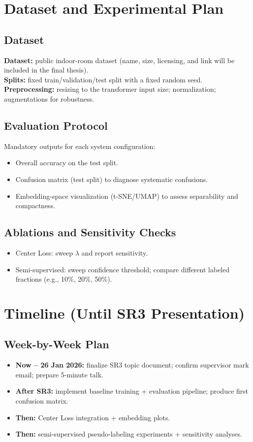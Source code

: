 \documentclass[english]{teza-upb_en}
\begin{document}
\chapter{Dataset and Experimental Plan}

\section{Dataset}
\textbf{Dataset:} public indoor-room dataset (name, size, licensing, and link will be included in the final thesis).\\
\textbf{Splits:} fixed train/validation/test split with a fixed random seed.\\
\textbf{Preprocessing:} resizing to the transformer input size; normalization; augmentations for robustness.

\section{Evaluation Protocol}
Mandatory outputs for each system configuration:
\begin{itemize}
  \item Overall accuracy on the test split.
  \item Confusion matrix (test split) to diagnose systematic confusions.
  \item Embedding-space visualization (t-SNE/UMAP) to assess separability and compactness.
\end{itemize}

\section{Ablations and Sensitivity Checks}
\begin{itemize}
  \item Center Loss: sweep $\lambda$ and report sensitivity.
  \item Semi-supervised: sweep confidence threshold; compare different labeled fractions (e.g., 10\%, 20\%, 50\%).
\end{itemize}

\chapter{Timeline (Until SR3 Presentation)}

\section{Week-by-Week Plan}
\begin{itemize}
  \item \textbf{Now -- 26 Jan 2026:} finalize SR3 topic document; confirm supervisor mark email; prepare 5-minute talk.
  \item \textbf{After SR3:} implement baseline training + evaluation pipeline; produce first confusion matrix.
  \item \textbf{Then:} Center Loss integration + embedding plots.
  \item \textbf{Then:} semi-supervised pseudo-labeling experiments + sensitivity analyses.
\end{itemize}



\end{document}
